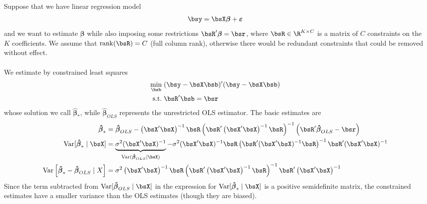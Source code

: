 \documentclass[12pt]{article}
\theoremstyle{plain}
\theoremstyle{definition}
\theoremstyle{remark}
\newcommand{\bsvarepsilon}{\boldsymbol{\varepsilon}}
\newcommand{\bsbeta}{\boldsymbol{\beta}}
\newcommand{\bshatbeta}{\boldsymbol{\hat{\beta}}}
\newcommand{\rank}{\operatorname{rank}}
\newcommand{\Var}{\operatorname{Var}}
\begin{document}
Suppose that we have linear regression model
\begin{align*}
  \bsy = \bsX\bsbeta + \bsvarepsilon
\end{align*}
and we want to estimate $\bsbeta$ while also imposing some restrictions
$\bsR'\bsbeta = \bsr$, where $\bsR\in\R^{K\times C}$ is a matrix of $C$
constraints on the $K$ coefficients. We assume that $\rank(\bsR)=C$
(full column rank), otherwise there would be redundant constraints that
could be removed without effect.
\\
\\
We estimate by constrained least squares
\begin{align*}
  \min_{\bsb} \; &(\bsy-\bsX\bsb)'(\bsy-\bsX\bsb)
  \\
  \text{s.t.} \; &
    \bsR'\bsb = \bsr
\end{align*}
whose solution we call $\bshatbeta_*$, while $\bshatbeta_{OLS}$
represents the unrestricted OLS estimator.
The basic estimates are
\begin{align*}
  \bshatbeta_*
  &=
  \bshatbeta_{OLS} - \left(\bsX'\bsX\right)^{-1}  \bsR
  \left(\bsR'\left(\bsX'\bsX\right)^{-1}  \bsR\right)^{-1}
  \left(\bsR'\bshatbeta_{OLS} -  \bsr\right)
  \\
  \Var[\bshatbeta_*\;|\;\bsX]
  &=
  \underbrace{\sigma^2(\bsX'\bsX)^{-1}}_{\Var(\bshatbeta_{OLS}|\bsX)}
  -
  \sigma^2(\bsX'\bsX)^{-1}  \bsR
  \left(\bsR'(\bsX'\bsX)^{-1}  \bsR\right)^{-1} \bsR'(\bsX'\bsX)^{-1}
  \\
  \Var\left[ \bshatbeta_*-\bshatbeta_{OLS} \;|\;X\right]
  &=
  \sigma^2
  \left(\bsX'\bsX\right)^{-1}  \bsR
  \left(\bsR'\left(\bsX'\bsX\right)^{-1}  \bsR\right)^{-1} \bsR'
  \left(\bsX'\bsX\right)^{-1}
\end{align*}
Since the term subtracted from $\Var[\bshatbeta_{OLS}\;|\;\bsX]$ in the
expression for $\Var[\bshatbeta_*\;|\;\bsX]$ is a positive semidefinite
matrix, the constrained estimates have a smaller variance than the OLS
estimates (though they are biased).
\end{document}
